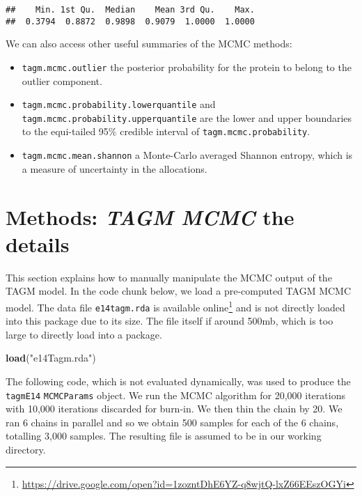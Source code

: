 \documentclass[9pt,a4paper,]{extarticle}
\newenvironment{Shaded}{\begin{snugshade}}{\end{snugshade}}
\newcommand{\KeywordTok}[1]{\textcolor[rgb]{0.13,0.29,0.53}{\textbf{#1}}}
\newcommand{\NormalTok}[1]{#1}
\newcommand{\StringTok}[1]{\textcolor[rgb]{0.31,0.60,0.02}{#1}}
\begin{document}
\begin{verbatim}
##    Min. 1st Qu.  Median    Mean 3rd Qu.    Max. 
##  0.3794  0.8872  0.9898  0.9079  1.0000  1.0000
\end{verbatim}

We can also access other useful summaries of the MCMC methods:

\begin{itemize}
\item
  \texttt{tagm.mcmc.outlier} the posterior probability for the protein
  to belong to the outlier component.
\item
  \texttt{tagm.mcmc.probability.lowerquantile} and \texttt{tagm.mcmc.probability.upperquantile}
  are the lower and upper boundaries to the equi-tailed 95\% credible interval
  of \texttt{tagm.mcmc.probability}.
\item
  \texttt{tagm.mcmc.mean.shannon} a Monte-Carlo averaged Shannon entropy,
  which is a measure of uncertainty in the allocations.
\end{itemize}

\hypertarget{methods-tagm-mcmc-the-details}{%
\section{\texorpdfstring{Methods: \emph{TAGM MCMC} the details}{Methods: TAGM MCMC the details}}\label{methods-tagm-mcmc-the-details}}

This section explains how to manually manipulate the MCMC output of
the TAGM model. In the code chunk below, we load a pre-computed
TAGM MCMC model. The data file \texttt{e14tagm.rda} is available online\footnote{\url{https://drive.google.com/open?id=1zozntDhE6YZ-q8wjtQ-lxZ66EEszOGYi}}
and is not directly loaded into this package due to its size. The file
itself if around 500mb, which is too large to directly load into a package.

\begin{Shaded}
\begin{Highlighting}[]
\KeywordTok{load}\NormalTok{(}\StringTok{"e14Tagm.rda"}\NormalTok{)}
\end{Highlighting}
\end{Shaded}

The following code, which is not evaluated dynamically, was used to
produce the \texttt{tagmE14} \texttt{MCMCParams} object. We run the MCMC algorithm
for 20,000 iterations with 10,000 iterations discarded for burn-in. We
then thin the chain by 20. We ran 6 chains in parallel and so we
obtain 500 samples for each of the 6 chains, totalling 3,000
samples. The resulting file is assumed to be in our working directory.
\end{document}
